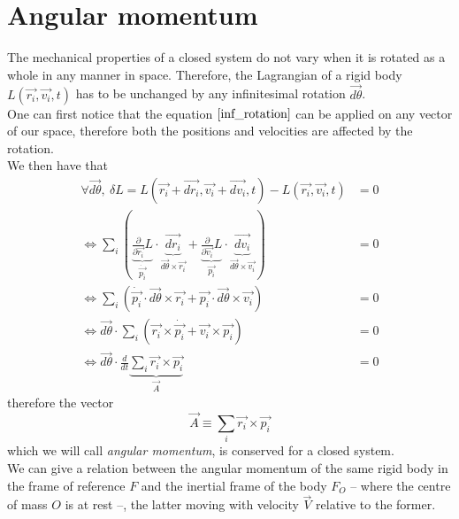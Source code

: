 \documentclass[class=report, float=false, crop=false]{standalone}
\begin{document}
\section{Angular momentum}

The mechanical properties of a closed system do not vary when it is rotated as a whole in any manner in space. Therefore, the Lagrangian of a rigid body $L(\vec{r_i},\vec{v_i},t)$ has to be unchanged by any infinitesimal rotation $\vec{d\theta}$.\\

One can first notice that the equation $\ref{inf_rotation}$ can be applied on any vector of our space, therefore both the positions and velocities are affected by the rotation.\\

We then have that
\begin{align*}
\forall \vec{d\theta},~ \delta L = L(\vec{r_i} + \vec{dr_i},\vec{v_i} + \vec{dv_i},t) - L(\vec{r_i},\vec{v_i},t) &= 0\\
\Leftrightarrow \sum_i \left( \underbrace{\frac{\partial}{\partial\vec{r_i}} L}_{\dot{\vec{p_i}}} \cdot \underbrace{\vec{dr_i}}_{\vec{d\theta} \times \vec{r_i}} + \underbrace{\frac{\partial}{\partial\vec{v_i}} L}_{\vec{p_i}} \cdot \underbrace{\vec{dv_i}}_{\vec{d\theta} \times \vec{v_i}} \right) &= 0\\
\Leftrightarrow \sum_i \left(\dot{\vec{p_i}} \cdot \vec{d\theta} \times \vec{r_i} + \vec{p_i} \cdot \vec{d\theta} \times \vec{v_i} \right) &= 0\\
\Leftrightarrow \vec{d\theta} \cdot \sum_i \left(\vec{r_i}\times\dot{\vec{p_i}} + \vec{v_i}\times\vec{p_i}\right) &= 0\\
\Leftrightarrow \vec{d\theta} \cdot \frac{d}{dt} \underbrace{\sum_i \vec{r_i}\times\vec{p_i}}_{\vec{A}} &= 0
\end{align*}
therefore the vector
\begin{equation}
\boxed{\vec{A} \equiv \sum_i \vec{r_i}\times\vec{p_i}}
\label{ang_momentum}
\end{equation}
which we will call \textit{angular momentum}, is conserved for a closed system.\\

We can give a relation between the angular momentum of the same rigid body in the frame of reference $F$ and the inertial frame of the body $F_O$ -- where the centre of mass $O$ is at rest --, the latter moving with velocity $\vec{V}$ relative to the former.\\
\end{document}

